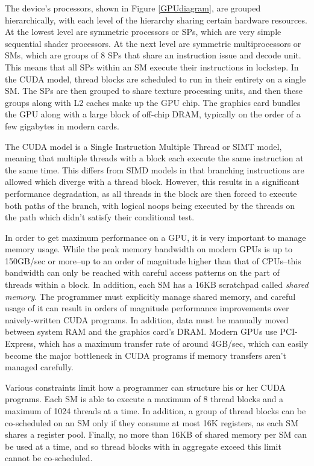 \documentclass[preprint]{sigplanconf}
\begin{document}
The device's processors, shown in Figure \ref{GPUdiagram}, are
grouped hierarchically, with each level of the hierarchy sharing certain
hardware resources.  At the lowest level are symmetric processors or SPs, which
are very simple sequential shader processors.  At the next level are symmetric
multiprocessors or SMs, which are groups of 8 SPs that share an instruction
issue and decode unit.  This means that all SPs within an SM execute their
instructions in lockstep.  In the CUDA model, thread blocks are scheduled to run
in their entirety on a single SM.  The SPs are then grouped to share texture
processing units, and then these groups along with L2 caches make up the GPU
chip.  The graphics card bundles the GPU along with a large block of off-chip
DRAM, typically on the order of a few gigabytes in modern cards.

The CUDA model is a Single Instruction Multiple Thread or SIMT model, meaning
that multiple threads with a block each execute the same instruction at the same
time.  This differs from SIMD models in that branching instructions are allowed
which diverge with a thread block.  However, this results in a significant
performance degradation, as all threads in the block are then forced to execute
both paths of the branch, with logical noops being executed by the threads on
the path which didn't satisfy their conditional test.

In order to get maximum performance on a GPU, it is very important to manage
memory usage.  While the peak memory bandwidth on modern GPUs is up to 150GB/sec
or more--up to an order of magnitude higher than that of CPUs--this bandwidth
can only be reached with careful access patterns on the part of threads within a
block.  In addition, each SM has a 16KB scratchpad called {\it shared memory}.
The programmer must explicitly manage shared memory, and careful usage of it can
result in orders of magnitude performance improvements over naively-written CUDA
programs.  In addition, data must be manually moved between system RAM and the
graphics card's DRAM.  Modern GPUs use PCI-Express, which has a maximum transfer
rate of around 4GB/sec, which can easily become the major bottleneck in CUDA
programs if memory transfers aren't managed carefully.

Various constraints limit how a programmer can structure his or her CUDA
programs.  Each SM is able to execute a maximum of 8 thread blocks and a maximum
of 1024 threads at a time.  In addition, a group of thread blocks can be
co-scheduled on an SM only if they consume at most 16K registers, as each SM
shares a register pool.  Finally, no more than 16KB of shared memory per SM can
be used at a time, and so thread blocks with in aggregate exceed this limit
cannot be co-scheduled.
\end{document}
